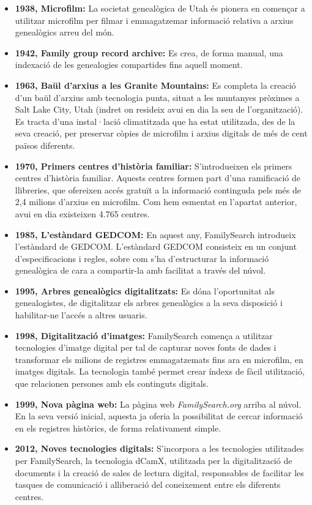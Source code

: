     \begin{itemize}
        \item \textbf{1938, Microfilm:} La societat genealògica de Utah és pionera en començar a utilitzar microfilm per filmar i emmagatzemar informació relativa a arxius genealògics arreu del món.
        \item \textbf{1942, Family group record archive:} Es crea, de forma manual, una indexació de les genealogies compartides fins aquell moment.
        \item \textbf{1963, Baül d’arxius a les Granite Mountains:} Es completa la creació d’un baül d’arxius amb tecnologia punta, situat a les muntanyes pròximes a Salt Lake City, Utah (indret on resideix avui en dia la seu de l’organització). Es tracta d’una instal·lació climatitzada que ha estat utilitzada, des de la seva creació, per preservar còpies de microfilm i arxius digitals de més de cent països diferents.
        \item \textbf{1970, Primers centres d'història familiar:} S'introdueixen els primers centres d'història familiar. Aquests centres formen part d'una ramificació de llibreries, que ofereixen accés gratuït a la informació continguda pels més de 2,4 milions d'arxius en microfilm. Com hem esmentat en l'apartat anterior, avui en dia existeixen 4.765 centres.
        \item \textbf{1985, L’estàndard GEDCOM:} En aquest any, FamilySearch introdueix l'estàndard de \gls{GEDCOM}. L'estàndard GEDCOM consisteix en un conjunt d'especificacions i regles, sobre com s'ha d'estructurar la informació genealògica de cara a compartir-la amb facilitat a través del núvol.
        \item \textbf{1995, Arbres genealògics digitalitzats:} Es dóna l’oportunitat als ge\-nea\-lo\-gis\-tes, de digitalitzar els arbres genealògics a la seva disposició i habilitar-ne l’accés a altres usuaris.
        \item \textbf{1998, Digitalització d’imatges:} FamilySearch comença a utilitzar tecnologies d'imatge digital per tal de capturar noves fonts de dades i transformar els milions de registres emmagatzemats fins ara en microfilm, en imatges digitals. La tecnologia també permet crear índexs de fàcil utilització, que relacionen persones amb els continguts digitals.
        \item \textbf{1999, Nova pàgina web:} La pàgina web \emph{FamilySearch.org} arriba al núvol. En la seva versió inicial, aquesta ja oferia la possibilitat de cercar informació en els registres històrics, de forma relativament simple.
        \item \textbf{2012, Noves tecnologies digitals:} S’incorpora a les tecnologies utilitzades per FamilySearch, la tecnologia dCamX, utilitzada per la digitalització de do\-cu\-ments i la creació de sales de lectura digital, responsables de facilitar les tasques de comunicació i alliberació del coneixement entre els diferents centres.
    \end{itemize}

